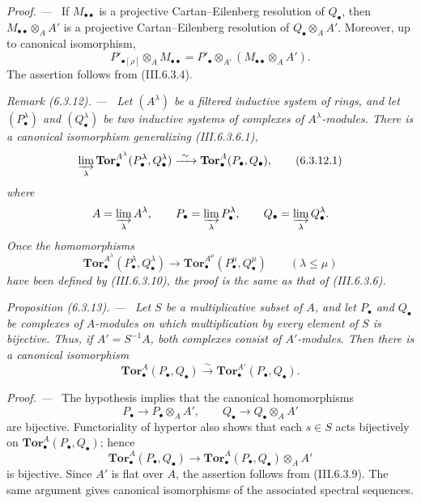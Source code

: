 \documentclass[10pt,oneside]{book}
\newcommand{\sref}[2][]{(#2)}
\newcommand{\oldpage}[2][]{\setcounter{footnote}{0}\marginpar{\scriptsize\textbf{#1}~|~#2}\ignorespaces}
\newenvironment{proposition}[1][]{\par\medskip\noindent\itshape Proposition (#1). ---\ }{\par}
\newenvironment{remark}[1][]{\par\medskip\noindent\itshape Remark (#1). ---\ }{\par}
\newenvironment{proof}{\par\medskip\noindent\textit{Proof. ---\ }}{\par}
\begin{document}
\begin{proof}
If $M_{\bullet\bullet}$ is a projective Cartan--Eilenberg
resolution of $Q_\bullet$, then
$M_{\bullet\bullet}\otimes_AA'$ is a projective
Cartan--Eilenberg resolution of $Q_\bullet\otimes_AA'$.  Moreover,
up to canonical isomorphism,
\[
  P'_{\bullet[\rho]}\otimes_AM_{\bullet\bullet}
  =
  P'_\bullet\otimes_{A'}
  (M_{\bullet\bullet}\otimes_AA').
\]
The assertion follows from \sref{III.6.3.4}.
\end{proof}

\begin{remark}[6.3.12]
\label{III.6.3.12}
Let $(A^\lambda)$ be a filtered inductive system of rings, and let
$(P_\bullet^\lambda)$ and $(Q_\bullet^\lambda)$ be two inductive
systems of complexes of $A^\lambda$-modules.  There is a canonical
isomorphism generalizing \sref{III.6.3.6.1},
\[
  \varinjlim_\lambda
  \mathbf{Tor}_\bullet^{A^\lambda}
  (P_\bullet^\lambda,Q_\bullet^\lambda)
  \xrightarrow{\ \sim\ }
  \mathbf{Tor}_\bullet^A(P_\bullet,Q_\bullet),
  \tag{6.3.12.1}\label{III.6.3.12.1}
\]
where
\[
  A=\varinjlim_\lambda A^\lambda,
  \qquad
  P_\bullet=\varinjlim_\lambda P_\bullet^\lambda,
  \qquad
  Q_\bullet=\varinjlim_\lambda Q_\bullet^\lambda.
\]
Once the homomorphisms
\[
  \mathbf{Tor}_\bullet^{A^\lambda}
  (P_\bullet^\lambda,Q_\bullet^\lambda)
  \longrightarrow
  \mathbf{Tor}_\bullet^{A^\mu}
  (P_\bullet^\mu,Q_\bullet^\mu)
  \qquad(\lambda\leq\mu)
\]
have been defined by \sref{III.6.3.10}, the proof is the same as
that of \sref{III.6.3.6}.
\end{remark}

\begin{proposition}[6.3.13]
\label{III.6.3.13}
Let $S$ be a multiplicative subset of $A$, and let $P_\bullet$ and
$Q_\bullet$ be complexes of $A$-modules on which multiplication by
every element of $S$ is bijective.  Thus, if $A'=S^{-1}A$, both
complexes consist of $A'$-modules.  Then there is a canonical
isomorphism
\[
  \mathbf{Tor}_\bullet^A(P_\bullet,Q_\bullet)
  \xrightarrow{\ \sim\ }
  \mathbf{Tor}_\bullet^{A'}(P_\bullet,Q_\bullet).
\]
\end{proposition}

\begin{proof}
The hypothesis implies that the canonical homomorphisms
\[
  P_\bullet\longrightarrow P_\bullet\otimes_AA',
  \qquad
  Q_\bullet\longrightarrow Q_\bullet\otimes_AA'
\]
are bijective.  Functoriality of hypertor also shows that each
$s\in S$ acts bijectively on
$\mathbf{Tor}_\bullet^A(P_\bullet,Q_\bullet)$; hence
\[
  \mathbf{Tor}_\bullet^A(P_\bullet,Q_\bullet)
  \longrightarrow
  \mathbf{Tor}_\bullet^A(P_\bullet,Q_\bullet)\otimes_AA'
\]
\oldpage[III]{146}
is bijective.  Since $A'$ is flat over $A$, the assertion follows
from \sref{III.6.3.9}.  The same argument gives canonical
isomorphisms of the associated spectral sequences.
\end{proof}
\end{document}
